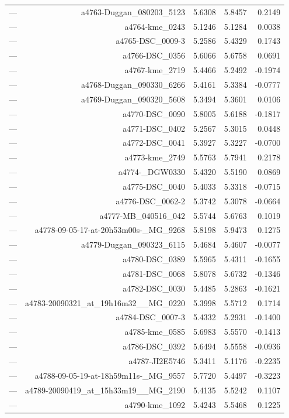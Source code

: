 \begin{table}[htbp]
\begin{tabular}{lrrrr}
— & a4763-Duggan_080203_5123 & 5.6308 & 5.8457 & 0.2149 \\
— & a4764-kme_0243 & 5.1246 & 5.1284 & 0.0038 \\
— & a4765-DSC_0009-3 & 5.2586 & 5.4329 & 0.1743 \\
— & a4766-DSC_0356 & 5.6066 & 5.6758 & 0.0691 \\
— & a4767-kme_2719 & 5.4466 & 5.2492 & -0.1974 \\
— & a4768-Duggan_090330_6266 & 5.4161 & 5.3384 & -0.0777 \\
— & a4769-Duggan_090320_5608 & 5.3494 & 5.3601 & 0.0106 \\
— & a4770-DSC_0090 & 5.8005 & 5.6188 & -0.1817 \\
— & a4771-DSC_0402 & 5.2567 & 5.3015 & 0.0448 \\
— & a4772-DSC_0041 & 5.3927 & 5.3227 & -0.0700 \\
— & a4773-kme_2749 & 5.5763 & 5.7941 & 0.2178 \\
— & a4774-_DGW0330 & 5.4320 & 5.5190 & 0.0869 \\
— & a4775-DSC_0040 & 5.4033 & 5.3318 & -0.0715 \\
— & a4776-DSC_0062-2 & 5.3742 & 5.3078 & -0.0664 \\
— & a4777-MB_040516_042 & 5.5744 & 5.6763 & 0.1019 \\
— & a4778-09-05-17-at-20h53m00s-_MG_9268 & 5.8198 & 5.9473 & 0.1275 \\
— & a4779-Duggan_090323_6115 & 5.4684 & 5.4607 & -0.0077 \\
— & a4780-DSC_0389 & 5.5965 & 5.4311 & -0.1655 \\
— & a4781-DSC_0068 & 5.8078 & 5.6732 & -0.1346 \\
— & a4782-DSC_0030 & 5.4485 & 5.2863 & -0.1621 \\
— & a4783-20090321_at_19h16m32__MG_0220 & 5.3998 & 5.5712 & 0.1714 \\
— & a4784-DSC_0007-3 & 5.4332 & 5.2931 & -0.1400 \\
— & a4785-kme_0585 & 5.6983 & 5.5570 & -0.1413 \\
— & a4786-DSC_0392 & 5.6494 & 5.5558 & -0.0936 \\
— & a4787-JI2E5746 & 5.3411 & 5.1176 & -0.2235 \\
— & a4788-09-05-19-at-18h59m11s-_MG_9557 & 5.7720 & 5.4497 & -0.3223 \\
— & a4789-20090419_at_15h33m19__MG_2190 & 5.4135 & 5.5242 & 0.1107 \\
— & a4790-kme_1092 & 5.4243 & 5.5468 & 0.1225 \\

\end{tabular}
\end{table}
